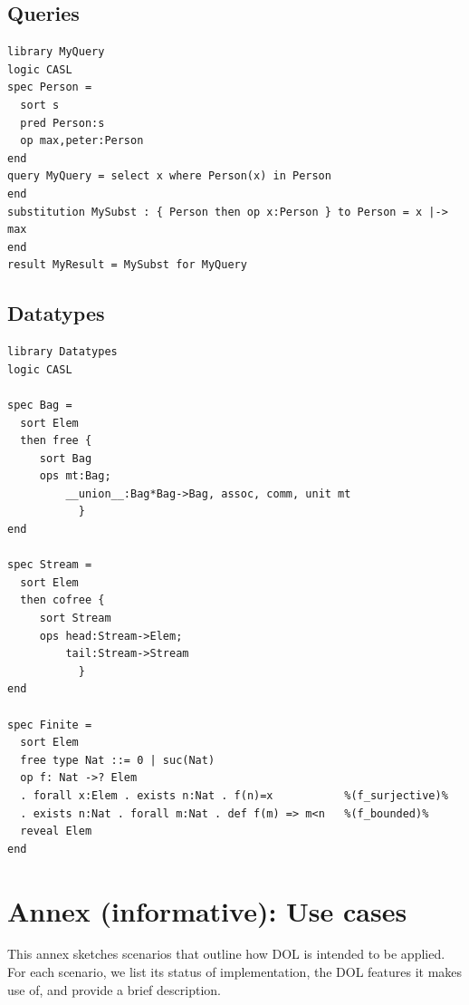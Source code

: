 \documentclass[10pt,fleqn,%
\ifpretendfinal
final%
\else
draft%
\fi,
]{scrreprt}
\newcommand{\sclause}[1]{\section{#1}}
\newcommand{\infannex}[1]{ \chapter{Annex (informative): #1} }
\begin{document}
\sclause{Queries}
\begin{lstlisting}[basicstyle=\ttfamily,language=dolText,morekeywords={props,ObjectProperty,Class,DisjointUnionOf,SubClassOf,Characteristics,Transitive,Asymmetric,SubPropertyOf,DisjointClasses,EquivalentTo,inverse,only,forall,iff,if,or,exists,query,select,where,in,substitution,result,for,along,library,spec,sort,pred,op},escapechar=@,mathescape]
library MyQuery
logic CASL
spec Person =
  sort s
  pred Person:s 
  op max,peter:Person
end
query MyQuery = select x where Person(x) in Person
end
substitution MySubst : { Person then op x:Person } to Person = x |-> max
end
result MyResult = MySubst for MyQuery
\end{lstlisting}

\sclause{Datatypes}

\begin{lstlisting}[basicstyle=\ttfamily,language=dolText,morekeywords={props,ObjectProperty,Class,DisjointUnionOf,SubClassOf,Characteristics,Transitive,Asymmetric,SubPropertyOf,DisjointClasses,EquivalentTo,inverse,only,forall,iff,if,or,exists,sort,ops,in,approximate,extract,free,cofree,spec},escapechar=@,mathescape]
library Datatypes
logic CASL

spec Bag =
  sort Elem
  then free {
     sort Bag
     ops mt:Bag;
         __union__:Bag*Bag->Bag, assoc, comm, unit mt
           }
end

spec Stream =
  sort Elem
  then cofree {
     sort Stream
     ops head:Stream->Elem;
         tail:Stream->Stream
           }
end

spec Finite =
  sort Elem
  free type Nat ::= 0 | suc(Nat)
  op f: Nat ->? Elem
  . forall x:Elem . exists n:Nat . f(n)=x           %(f_surjective)%
  . exists n:Nat . forall m:Nat . def f(m) => m<n   %(f_bounded)%
  reveal Elem
end

\end{lstlisting}

\infannex{Use cases}\label{a:use-cases}

This annex sketches scenarios that outline how DOL is intended to be applied.  For each scenario, we list its status of implementation, the DOL features it makes use of, and provide a brief description.
\end{document}
